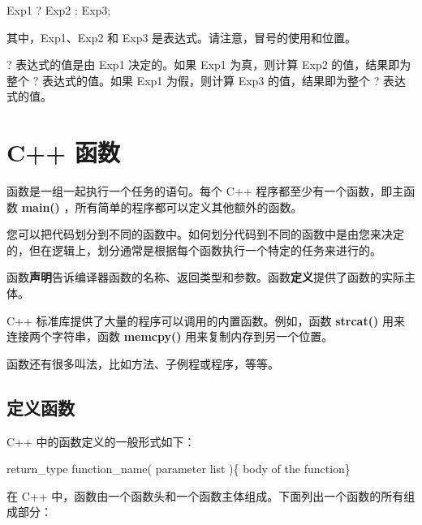 \documentclass[
]{article}
\newenvironment{Shaded}{}{}
\newcommand{\DataTypeTok}[1]{\textcolor[rgb]{0.56,0.13,0.00}{#1}}
\newcommand{\NormalTok}[1]{#1}
\newcommand{\OperatorTok}[1]{\textcolor[rgb]{0.40,0.40,0.40}{#1}}
\begin{document}
\begin{Shaded}
\begin{Highlighting}[]
\NormalTok{Exp1 }\OperatorTok{?}\NormalTok{ Exp2 }\OperatorTok{:}\NormalTok{ Exp3}\OperatorTok{;}
\end{Highlighting}
\end{Shaded}

其中，Exp1、Exp2 和 Exp3 是表达式。请注意，冒号的使用和位置。

? 表达式的值是由 Exp1 决定的。如果 Exp1 为真，则计算 Exp2
的值，结果即为整个 ? 表达式的值。如果 Exp1 为假，则计算 Exp3
的值，结果即为整个 ? 表达式的值。

\hypertarget{c-ux51fdux6570}{%
\section{C++ 函数}\label{c-ux51fdux6570}}

函数是一组一起执行一个任务的语句。每个 C++
程序都至少有一个函数，即主函数 \textbf{main()}
，所有简单的程序都可以定义其他额外的函数。

您可以把代码划分到不同的函数中。如何划分代码到不同的函数中是由您来决定的，但在逻辑上，划分通常是根据每个函数执行一个特定的任务来进行的。

函数\textbf{声明}告诉编译器函数的名称、返回类型和参数。函数\textbf{定义}提供了函数的实际主体。

C++ 标准库提供了大量的程序可以调用的内置函数。例如，函数
\textbf{strcat()} 用来连接两个字符串，函数 \textbf{memcpy()}
用来复制内存到另一个位置。

函数还有很多叫法，比如方法、子例程或程序，等等。

\hypertarget{ux5b9aux4e49ux51fdux6570}{%
\subsection{定义函数}\label{ux5b9aux4e49ux51fdux6570}}

C++ 中的函数定义的一般形式如下：

\begin{Shaded}
\begin{Highlighting}[]
\DataTypeTok{return\_type}\NormalTok{ function\_name}\OperatorTok{(}\NormalTok{ parameter list }\OperatorTok{)\{}\NormalTok{   body of the function}\OperatorTok{\}}
\end{Highlighting}
\end{Shaded}

在 C++
中，函数由一个函数头和一个函数主体组成。下面列出一个函数的所有组成部分：
\end{document}
